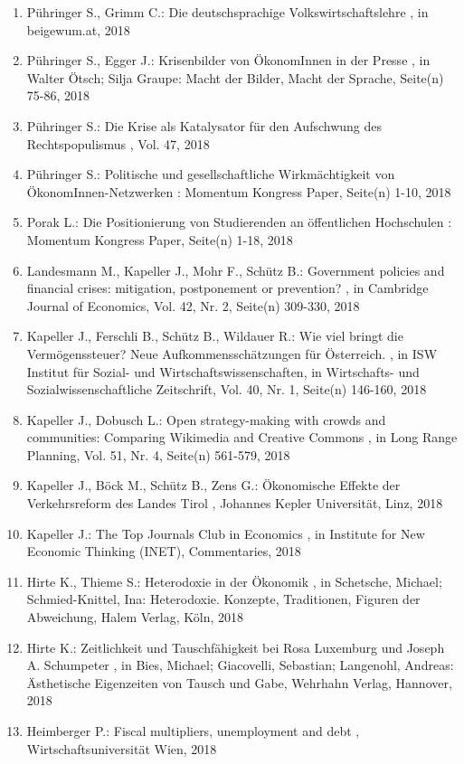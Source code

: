 \begin{enumerate}[leftmargin=*, labelsep=0.5cm]
	 \item Pühringer S., Grimm C.:  Die deutschsprachige Volkswirtschaftslehre  , in beigewum.at, 2018
	 \item Pühringer S., Egger J.:  Krisenbilder von ÖkonomInnen in der Presse  , in Walter Ötsch; Silja Graupe: Macht der Bilder, Macht der Sprache, Seite(n) 75-86, 2018
	 \item Pühringer S.:  Die Krise als Katalysator für den Aufschwung des Rechtspopulismus  , Vol. 47, 2018
	 \item Pühringer S.:  Politische und gesellschaftliche Wirkmächtigkeit von ÖkonomInnen-Netzwerken  : Momentum Kongress Paper, Seite(n) 1-10, 2018
	 \item Porak L.:  Die Positionierung von Studierenden an öffentlichen Hochschulen  : Momentum Kongress Paper, Seite(n) 1-18, 2018
	 \item Landesmann M., Kapeller J., Mohr F., Schütz B.:  Government policies and financial crises: mitigation, postponement or prevention?  , in Cambridge Journal of Economics, Vol. 42, Nr. 2, Seite(n) 309-330, 2018
	 \item Kapeller J., Ferschli B., Schütz B., Wildauer R.:  Wie viel bringt die Vermögenssteuer? Neue Aufkommensschätzungen für Österreich.  , in ISW Institut für Sozial- und Wirtschaftswissenschaften, in Wirtschafts- und Sozialwissenschaftliche Zeitschrift, Vol. 40, Nr. 1, Seite(n) 146-160, 2018
	 \item Kapeller J., Dobusch L.:  Open strategy-making with crowds and communities: Comparing Wikimedia and Creative Commons  , in Long Range Planning, Vol. 51, Nr. 4, Seite(n) 561-579, 2018
	 \item Kapeller J., Böck M., Schütz B., Zens G.:  Ökonomische Effekte der Verkehrsreform des Landes Tirol  , Johannes Kepler Universität, Linz, 2018
	 \item Kapeller J.:  The Top Journals Club in Economics  , in Institute for New Economic Thinking (INET), Commentaries, 2018
	 \item Hirte K., Thieme S.:  Heterodoxie in der Ökonomik  , in Schetsche, Michael; Schmied-Knittel, Ina: Heterodoxie. Konzepte, Traditionen, Figuren der Abweichung, Halem Verlag, Köln, 2018
	 \item Hirte K.:  Zeitlichkeit und Tauschfähigkeit bei Rosa Luxemburg und Joseph A. Schumpeter  , in Bies, Michael; Giacovelli, Sebastian; Langenohl, Andreas: Ästhetische Eigenzeiten von Tausch und Gabe, Wehrhahn Verlag, Hannover, 2018
	 \item Heimberger P.:  Fiscal multipliers, unemployment and debt  , Wirtschaftsuniversität Wien, 2018

\end{enumerate}
